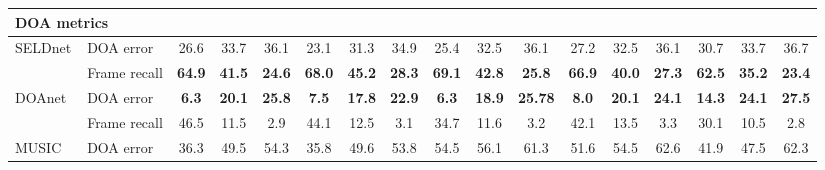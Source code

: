\documentclass[journal]{IEEEtran}
\begin{document}
\begin{table*}[!htb]
\begin{tabular}{l|l|ccc|ccc|ccc|ccc|ccc|}
\multicolumn{17}{l}{DOA metrics} \\ \hline
SELDnet & DOA error & 26.6 & 33.7 & 36.1 & 23.1 & 31.3 & 34.9 & 25.4 & 32.5 & 36.1 & 27.2 & 32.5 & 36.1 & 30.7 & 33.7 & 36.7 \\
& Frame recall &\bf 64.9 & \bf41.5 &\bf 24.6 & \bf68.0 & \bf45.2 &\bf 28.3 &\bf 69.1 & \bf42.8 & \bf25.8 &\bf 66.9 &\bf 40.0 & \bf27.3 & \bf62.5 & \bf35.2 & \bf23.4 \\ \cline{2-17}
DOAnet~\cite{Adavanne2018_EUSIPCO} & DOA error & \bf6.3 & \bf20.1 & \bf25.8 & \bf7.5 &\bf 17.8 &\bf 22.9 & \bf6.3 & \bf18.9 &\bf 25.78 & \bf8.0 & \bf20.1 & \bf24.1 & \bf14.3 & \bf24.1 & \bf27.5 \\
& Frame recall & 46.5 & 11.5 & 2.9 & 44.1 & 12.5 & 3.1 & 34.7 & 11.6 & 3.2 & 42.1 & 13.5 & 3.3 & 30.1 & 10.5 & 2.8 \\ \cline{2-17}
MUSIC & DOA error & 36.3 & 49.5 & 54.3 & 35.8 & 49.6 & 53.8 & 54.5 & 56.1 & 61.3 & 51.6 & 54.5 & 62.6 & 41.9 & 47.5 & 62.3 
\end{tabular}

\end{table*}
\end{document}

